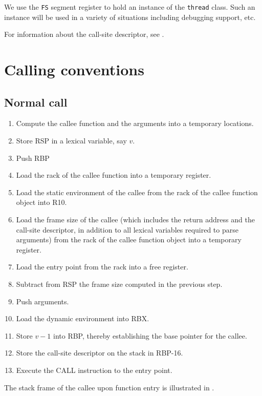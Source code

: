 We use the \texttt{FS} segment register to hold an instance of the
\texttt{thread} class.  Such an instance will be used in a variety of
situations including debugging support, etc.

For information about the call-site descriptor, see
.

\section{Calling conventions}

\subsection{Normal call}

\begin{enumerate}
\item Compute the callee function and the arguments into a temporary
  locations.
\item Store RSP in a lexical variable, say $v$.
\item Push RBP
\item Load the rack of the callee function into a temporary register.
\item Load the static environment of the callee from the rack of the
  callee function object into R10.
\item Load the frame size of the callee (which
  includes the return address and the call-site descriptor, in
  addition to all lexical variables required to parse arguments) from
  the rack of the callee function object into a temporary register.
\item Load the entry point from the rack into a free register.
\item Subtract from RSP the frame size computed in the
  previous step.
\item Push arguments.
\item Load the dynamic environment into RBX.
\item Store $v-1$ into RBP, thereby establishing the base pointer
  for the callee.
\item Store the call-site descriptor on the stack in RBP-16.
\item Execute the CALL instruction to the entry point.
\end{enumerate}

The stack frame of the callee upon function entry is illustrated in
.

